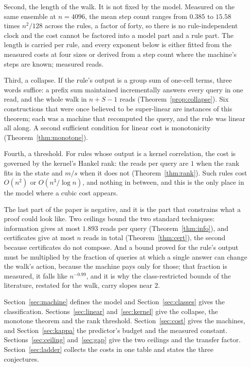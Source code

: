 \documentclass[11pt]{article}
\theoremstyle{remark}
\begin{document}
Second, the length of the walk. It is not fixed by the model. Measured on the same ensemble at
$n=4096$, the mean step count ranges from $0.385$ to $15.58$ times $n^{2}/128$ across the rules, a
factor of forty, so there is no rule-independent clock and the cost cannot be factored into a
model part and a rule part. The length is carried per rule, and every exponent below is either fitted from the measured costs at
four sizes or derived from a step count where the machine's steps are known;
measured reads.

Third, a collapse. If the rule's output is a group sum of one-cell terms, three words suffice: a
prefix sum maintained incrementally answers every query in one read, and the whole walk in $n+S-1$
reads (Theorem~\ref{prop:collapse}). Six constructions that were once believed to be super-linear
are instances of this theorem; each was a machine that recomputed the query, and the rule was
linear all along. A second sufficient condition for linear cost is monotonicity
(Theorem~\ref{thm:monotone}).

Fourth, a threshold. For rules whose output is a kernel correlation, the cost is governed by the
kernel's Hankel rank: the reads per query are $1$ when the rank fits in the state and $m/s$ when it
does not (Theorem~\ref{thm:rank}). Such rules cost $O(n^{2})$ or $O(n^{3}/\log n)$, and
nothing in between, and this is the only place in the model where a cubic cost appears.

The last part of the paper is negative, and it is the part that constrains what a proof could look
like. Two ceilings bound the two standard techniques: information gives at most $1.893$ reads per query
(Theorem~\ref{thm:info}), and certificates give at most $n$ reads in total
(Theorem~\ref{thm:cert}), the second because certificates do not compose. And a bound proved for
the rule's output must be multiplied by the fraction of queries at which a single answer can change
the walk's action, because the machine pays only for those; that fraction is measured, it falls like
$n^{-0.99}$, and it is why the class-restricted bounds of the literature, restated for the walk,
carry slopes near $2$.

Section~\ref{sec:machine} defines the model and Section~\ref{sec:classes} gives the classification.
Sections~\ref{sec:linear} and~\ref{sec:kernel} give the collapse, the monotone theorem and the rank
threshold. Section~\ref{sec:cost} gives the machines, and Section~\ref{sec:kappa} the predictor's
budget and the measured constant. Sections~\ref{sec:ceiling} and~\ref{sec:gap} give the two ceilings
and the transfer factor. Section~\ref{sec:ladder} collects the costs in one table and states the
three conjectures.
\end{document}
